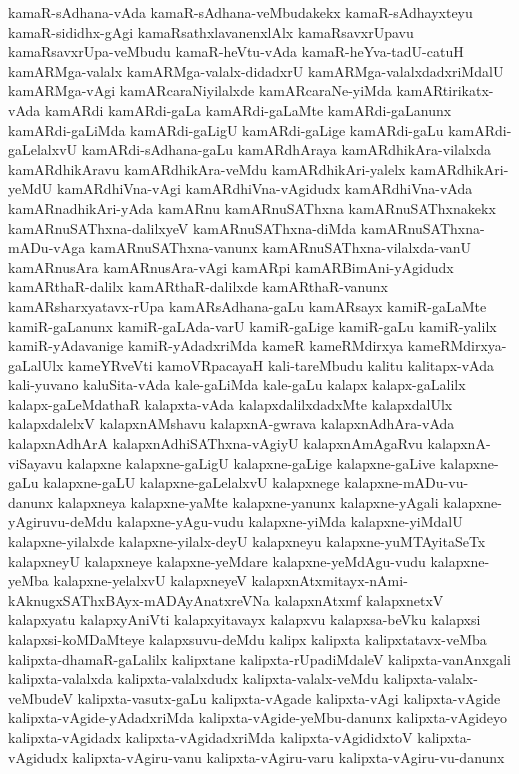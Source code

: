 {kamaR-sAdhana-vAda
kamaR-sAdhana-veMbudakekx
kamaR-sAdhayxteyu
kamaR-sididhx-gAgi
kamaRsathxlavanenxlAlx
kamaRsavxrUpavu
kamaRsavxrUpa-veMbudu
kamaR-heVtu-vAda
kamaR-heYva-tadU-catuH
kamARMga-valalx
kamARMga-valalx-didadxrU
kamARMga-valalxdadxriMdalU
kamARMga-vAgi
kamARcaraNiyilalxde
kamARcaraNe-yiMda
kamARtirikatx-vAda
kamARdi
kamARdi-gaLa
kamARdi-gaLaMte
kamARdi-gaLanunx
kamARdi-gaLiMda
kamARdi-gaLigU
kamARdi-gaLige
kamARdi-gaLu
kamARdi-gaLelalxvU
kamARdi-sAdhana-gaLu
kamARdhAraya
kamARdhikAra-vilalxda
kamARdhikAravu
kamARdhikAra-veMdu
kamARdhikAri-yalelx
kamARdhikAri-yeMdU
kamARdhiVna-vAgi
kamARdhiVna-vAgidudx
kamARdhiVna-vAda
kamARnadhikAri-yAda
kamARnu
kamARnuSAThxna
kamARnuSAThxnakekx
kamARnuSAThxna-dalilxyeV
kamARnuSAThxna-diMda
kamARnuSAThxna-mADu-vAga
kamARnuSAThxna-vanunx
kamARnuSAThxna-vilalxda-vanU
kamARnusAra
kamARnusAra-vAgi
kamARpi
kamARBimAni-yAgidudx
kamARthaR-dalilx
kamARthaR-dalilxde
kamARthaR-vanunx
kamARsharxyatavx-rUpa
kamARsAdhana-gaLu
kamARsayx
kamiR-gaLaMte
kamiR-gaLanunx
kamiR-gaLAda-varU
kamiR-gaLige
kamiR-gaLu
kamiR-yalilx
kamiR-yAdavanige
kamiR-yAdadxriMda
kameR
kameRMdirxya
kameRMdirxya-gaLalUlx
kameYRveVti
kamoVRpacayaH
kali-tareMbudu
kalitu
kalitapx-vAda
kali-yuvano
kaluSita-vAda
kale-gaLiMda
kale-gaLu
kalapx
kalapx-gaLalilx
kalapx-gaLeMdathaR
kalapxta-vAda
kalapxdalilxdadxMte
kalapxdalUlx
kalapxdalelxV
kalapxnAMshavu
kalapxnA-gwrava
kalapxnAdhAra-vAda
kalapxnAdhArA
kalapxnAdhiSAThxna-vAgiyU
kalapxnAmAgaRvu
kalapxnA-viSayavu
kalapxne
kalapxne-gaLigU
kalapxne-gaLige
kalapxne-gaLive
kalapxne-gaLu
kalapxne-gaLU
kalapxne-gaLelalxvU
kalapxnege
kalapxne-mADu-vu-danunx
kalapxneya
kalapxne-yaMte
kalapxne-yanunx
kalapxne-yAgali
kalapxne-yAgiruvu-deMdu
kalapxne-yAgu-vudu
kalapxne-yiMda
kalapxne-yiMdalU
kalapxne-yilalxde
kalapxne-yilalx-deyU
kalapxneyu
kalapxne-yuMTAyitaSeTx
kalapxneyU
kalapxneye
kalapxne-yeMdare
kalapxne-yeMdAgu-vudu
kalapxne-yeMba
kalapxne-yelalxvU
kalapxneyeV
kalapxnAtxmitayx-nAmi-kAknugxSAThxBAyx-mADAyAnatxreVNa
kalapxnAtxmf
kalapxnetxV
kalapxyatu
kalapxyAniVti
kalapxyitavayx
kalapxvu
kalapxsa-beVku
kalapxsi
kalapxsi-koMDaMteye
kalapxsuvu-deMdu
kalipx
kalipxta
kalipxtatavx-veMba
kalipxta-dhamaR-gaLalilx
kalipxtane
kalipxta-rUpadiMdaleV
kalipxta-vanAnxgali
kalipxta-valalxda
kalipxta-valalxdudx
kalipxta-valalx-veMdu
kalipxta-valalx-veMbudeV
kalipxta-vasutx-gaLu
kalipxta-vAgade
kalipxta-vAgi
kalipxta-vAgide
kalipxta-vAgide-yAdadxriMda
kalipxta-vAgide-yeMbu-danunx
kalipxta-vAgideyo
kalipxta-vAgidadx
kalipxta-vAgidadxriMda
kalipxta-vAgididxtoV
kalipxta-vAgidudx
kalipxta-vAgiru-vanu
kalipxta-vAgiru-varu
kalipxta-vAgiru-vu-danunx
}
